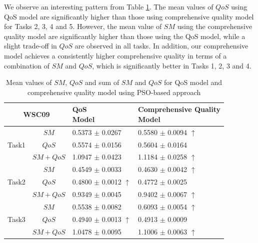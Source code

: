 \documentclass{llncs}
\begin{document}
We observe an interesting pattern from Table \ref{decisionTable}. The mean values of $QoS$ using QoS model are significantly higher than those using comprehensive quality model for Tasks 2, 3, 4 and 5. However, the mean value of $SM$ using the comprehensive quality model are significantly higher than those using the QoS model, while a slight trade-off in $QoS$ are observed in all tasks. In addition, our comprehensive model achieves a consistently higher comprehensive quality in terms of a combination of $SM$ and $QoS$, which is significantly better in Tasks 1, 2, 3 and 4. 
\vspace{-0.8cm}
\begin{table}[]
\footnotesize
\centering
\caption{Mean values of $SM$, $QoS$ and sum of $SM$ and $QoS$ for QoS model and comprehensive quality model using PSO-based approach}
\label{decisionTable}
\begin{tabular}{c|c|l|l}
\hline
\multicolumn{2}{c|}{WSC09}              & \shortstack{QoS \\ Model}         &\shortstack{Comprehensive Quality \\ Model} \\ \hline
\multirow{3}{*}{Task1}  &$SM$      &0.5373 $\pm$ 0.0267               &0.5580 $\pm$ 0.0094 $\uparrow$ \\ \cline{2-4}
                        &$QoS$     &0.5574 $\pm$ 0.0156               &0.5604 $\pm$ 0.0164            \\ \cline{2-4}
                        &$SM+QoS$  &1.0947 $\pm$ 0.0423               &1.1184 $\pm$ 0.0258 $\uparrow$ \\ \hline
\multirow{3}{*}{Task2}  &$SM$      &0.4549 $\pm$ 0.0033               &0.4630 $\pm$ 0.0042 $\uparrow$ \\ \cline{2-4} 
                        &$QoS$     &0.4800 $\pm$ 0.0012 $\uparrow$    &0.4772 $\pm$ 0.0025            \\ \cline{2-4}
                        &$SM+QoS$  &0.9349 $\pm$ 0.0045               &0.9402 $\pm$ 0.0067 $\uparrow$           \\ \hline
\multirow{3}{*}{Task3}  &$SM$      &0.5538 $\pm$ 0.0082               &0.6093 $\pm$ 0.0054 $\uparrow$ \\ \cline{2-4} 
                        &$QoS$     &0.4940 $\pm$ 0.0013 $\uparrow$    &0.4913 $\pm$ 0.0009            \\ \cline{2-4}
                        &$SM+QoS$  &1.0478 $\pm$ 0.0095               &1.1006 $\pm$ 0.0063 $\uparrow$           \\ \hline

\end{tabular}
\end{table}
\end{document}
